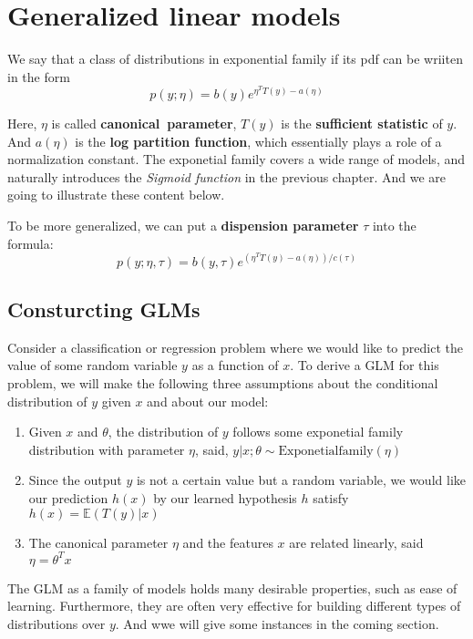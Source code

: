 \chapter{Generalized linear models}

\begin{define}
    We say that a class of distributions in exponential family if its pdf can be wriiten in the form
    \[p(y;\eta)=b(y)e^{\eta^TT(y)-a(\eta)}\]
\end{define}
Here, $\eta$ is called \textbf{canonical~parameter}, $T(y)$ is the \textbf{sufficient statistic} of $y$. And $a(\eta)$ is the \textbf{log partition function}, which essentially plays a role of a 
normalization constant. The exponetial family covers a wide range of models, and naturally introduces the \textit{Sigmoid function} in the previous chapter. And we are going to illustrate these content below.

To be more generalized, we can put a \textbf{dispension parameter} $\tau$ into the formula:
\[p(y;\eta,\tau)=b(y,\tau)e^{(\eta^TT(y)-a(\eta))/c(\tau)}\]

\section{Consturcting GLMs}

Consider a classification or regression problem where we would like to predict the value of some random variable $y$ as a function of $x$. To derive a GLM for this problem, we will make the following
three assumptions about the conditional distribution of $y$ given $x$ and about our model:
\begin{enumerate}
    \item Given $x$ and $\theta$, the distribution of $y$ follows some exponetial family distribution with parameter $\eta$, said, $y|x;\theta \sim \text{Exponetialfamily}(\eta)$
    \item Since the output $y$ is not a certain value but a random variable, we would like our prediction $h(x)$ by our learned hypothesis $h$ satisfy $h(x)=\mathbb{E}(T(y)|x)$
    \item The canonical parameter $\eta$ and the features $x$ are related linearly, said $\eta = \theta^Tx$
\end{enumerate}

The GLM as a family of models holds many desirable properties, such as ease of learning. Furthermore, they are often very effective for building different types of distributions over $y$. And wwe will
give some instances in the coming section.

